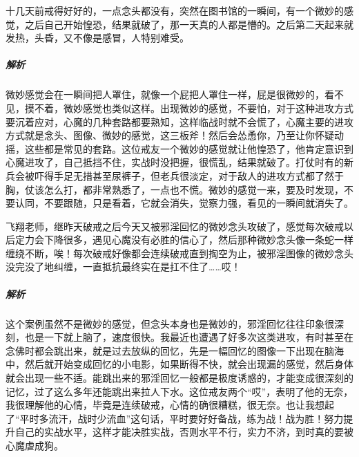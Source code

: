 \begin{case}[如何战胜微妙的感觉]
    十几天前戒得好好的，一点念头都没有，突然在图书馆的一瞬间，有一个微妙的感觉，之后自己开始惶恐，结果就破了，那一天真的人都是懵的。之后第二天起来就发热，头昏，又不像是感冒，人特别难受。
    \subparagraph{解析} 微妙感觉会在一瞬间把人罩住，就像一个屁把人罩住一样，屁是很微妙的，看不见，摸不着，微妙感觉也类似这样。出现微妙的感觉，不要怕，对于这种进攻方式要沉着应对，心魔的几种套路都要熟知，这样临战时就不会慌了，心魔主要的进攻方式就是念头、图像、微妙的感觉，这三板斧！然后会怂恿你，乃至让你怀疑动摇，这些都是常见的套路。这位戒友一个微妙的感觉就让他惶恐了，他肯定意识到心魔进攻了，自己抵挡不住，实战时没把握，很慌乱，结果就破了。打仗时有的新兵会被吓得手足无措甚至尿裤子，但老兵很淡定，对于敌人的进攻方式都了然于胸，仗该怎么打，都非常熟悉了，一点也不慌。微妙的感觉一来，要及时发现，不要认同，不要跟随，只是看着，它就会消失，觉察力强，看见的一瞬间就消失了。
\end{case}

\begin{case}[如何战胜微妙的感觉]
    飞翔老师，继昨天破戒之后今天又被邪淫回忆的微妙念头攻破了，感觉每次破戒以后定力会下降很多，遇见心魔没有必胜的信心了，然后那种微妙念头像一条蛇一样缠绕不断，唉！每次破戒好像都会连续破戒直到掏空为止，被邪淫图像的微妙念头没完没了地纠缠，一直抵抗最终实在是扛不住了……哎！
    \subparagraph{解析} 这个案例虽然不是微妙的感觉，但念头本身也是微妙的，邪淫回忆往往印象很深刻，也是一下就上脑了，速度很快。我最近也遭遇了好多次这类进攻，有时甚至在念佛时都会跳出来，就是过去放纵的回忆，先是一幅回忆的图像一下出现在脑海中，然后就开始变成回忆的小电影，如果断得不快，就会出现漏的感觉，然后身体就会出现一些不适。能跳出来的邪淫回忆一般都是极度诱惑的，才能变成很深刻的记忆，过了这么多年还能跳出来拉人下水。这位戒友两个“哎”，表明了他的无奈，我很理解他的心情，毕竟是连续破戒，心情的确很糟糕，很无奈。也让我想起了“平时多流汗，战时少流血”这句话，平时要好好备战，练为战！战为胜！努力提升自己的实战水平，这样才能决胜实战，否则水平不行，实力不济，到时真的要被心魔虐成狗。
\end{case}

